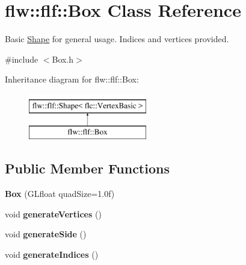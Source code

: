 \hypertarget{classflw_1_1flf_1_1Box}{}\section{flw\+:\+:flf\+:\+:Box Class Reference}
\label{classflw_1_1flf_1_1Box}


Basic \hyperlink{classflw_1_1flf_1_1Shape}{Shape} for general usage. Indices and vertices provided.  




{\ttfamily \#include $<$Box.\+h$>$}

Inheritance diagram for flw\+:\+:flf\+:\+:Box\+:\begin{figure}[H]
\begin{center}
\leavevmode
\includegraphics[height=2.000000cm]{classflw_1_1flf_1_1Box}
\end{center}
\end{figure}
\subsection*{Public Member Functions}
\begin{DoxyCompactItemize}
\item 
{\bfseries Box} (G\+Lfloat quad\+Size=1.\+0f)\hypertarget{classflw_1_1flf_1_1Box_a1810262c6b67eb89f6780b6c1513fd13}{}\label{classflw_1_1flf_1_1Box_a1810262c6b67eb89f6780b6c1513fd13}

\item 
void {\bfseries generate\+Vertices} ()\hypertarget{classflw_1_1flf_1_1Box_a3c136b1b3d75e5a79c86136074c93cf7}{}\label{classflw_1_1flf_1_1Box_a3c136b1b3d75e5a79c86136074c93cf7}

\item 
void {\bfseries generate\+Side} ()\hypertarget{classflw_1_1flf_1_1Box_a3c137640c604691d4398293e0a8b7382}{}\label{classflw_1_1flf_1_1Box_a3c137640c604691d4398293e0a8b7382}

\item 
void {\bfseries generate\+Indices} ()\hypertarget{classflw_1_1flf_1_1Box_a0b8cc4c091b5e086cb510a25bd462a62}{}\label{classflw_1_1flf_1_1Box_a0b8cc4c091b5e086cb510a25bd462a62}

\end{DoxyCompactItemize}
